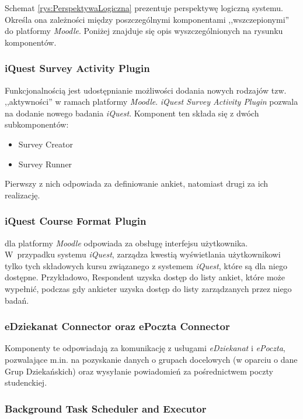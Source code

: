 Schemat \ref{rys:PerspektywaLogiczna} prezentuje perspektywę logiczną systemu. Określa ona zależności między poszczególnymi komponentami ,,wszczepionymi'' do platformy \textit{Moodle}. Poniżej znajduje się opis wyszczególnionych na rysunku komponentów.

\subsubsection{iQuest Survey Activity Plugin}
\label{Chapter5421}
Funkcjonalnością  jest udostępnianie możliwości dodania nowych rodzajów tzw. ,,aktywności'' w ramach platformy \textit{Moodle}. \textit{iQuest Survey Activity Plugin} pozwala na dodanie nowego badania \textit{iQuest}. Komponent ten składa się z dwóch subkomponentów:
\begin{itemize}
\item{Survey Creator}
\item{Survey Runner}
\end{itemize}
Pierwszy z nich odpowiada za definiowanie ankiet, natomiast drugi za ich realizację.

\subsubsection{iQuest Course Format Plugin}
\label{Chapter5422}

 dla platformy \textit{Moodle} odpowiada za obsługę interfejsu użytkownika. W~przypadku systemu \textit{iQuest}, zarządza kwestią wyświetlania użytkownikowi tylko tych składowych kursu związanego z systemem \textit{iQuest}, które są dla niego dostępne. Przykładowo, Respondent uzyska dostęp do listy ankiet, które może wypełnić, podczas gdy ankieter uzyska dostęp do listy zarządzanych przez niego badań.

\subsubsection{eDziekanat Connector oraz ePoczta Connector}
\label{Chapter5423}

Komponenty te odpowiadają za komunikację z usługami \textit{eDziekanat} i \textit{ePoczta}, pozwalające m.in. na pozyskanie danych o grupach docelowych (w oparciu o dane Grup Dziekańskich) oraz wysyłanie powiadomień za pośrednictwem poczty studenckiej.

\subsubsection{Background Task Scheduler and Executor}
\label{Chapter5424}

